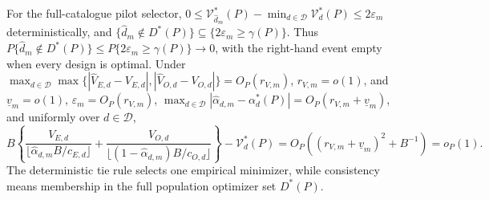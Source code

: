 For the full-catalogue pilot selector, \(0\le\mathcal V_{\widehat d_m}^*(P)-\min_{d\in\mathcal D}\mathcal V_d^*(P)\le2\varepsilon_m\) deterministically, and \(\{\widehat d_m\notin D^*(P)\}\subseteq\{2\varepsilon_m\ge\gamma(P)\}\). Thus \(P\{\widehat d_m\notin D^*(P)\}\le P\{2\varepsilon_m\ge\gamma(P)\}\to0\), with the right-hand event empty when every design is optimal. Under \(\max_{d\in\mathcal D}\max\{|\widehat V_{E,d}-V_{E,d}|,|\widehat V_{O,d}-V_{O,d}|\}=O_P(r_{V,m})\), \(r_{V,m}=o(1)\), and \(\underline v_m=o(1)\), \(\varepsilon_m=O_P(r_{V,m})\), \(\max_{d\in\mathcal D}|\widehat\alpha_{d,m}-\alpha_d^*(P)|=O_P(r_{V,m}+\underline v_m)\), and uniformly over \(d\in\mathcal D\),
\[
B\left\{\frac{V_{E,d}}{\lfloor\widehat\alpha_{d,m}B/c_{E,d}\rfloor}
+\frac{V_{O,d}}{\lfloor(1-\widehat\alpha_{d,m})B/c_{O,d}\rfloor}\right\}
-\mathcal V_d^*(P)
=O_P\!\left((r_{V,m}+\underline v_m)^2+B^{-1}\right)=o_P(1).
\]
The deterministic tie rule selects one empirical minimizer, while consistency means membership in the full population optimizer set \(D^*(P)\).